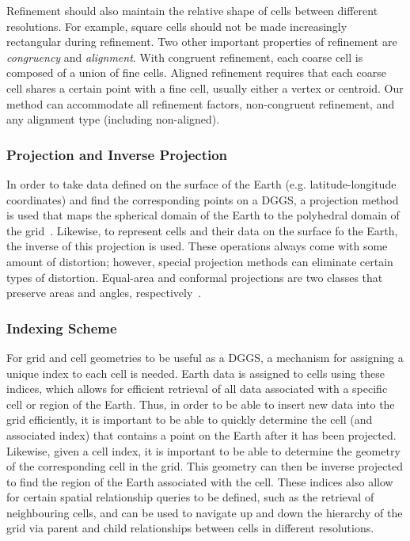 Refinement should also maintain the relative shape of cells between different resolutions.
For example, square cells should not be made increasingly rectangular during refinement.
Two other important properties of refinement are \textit{congruency} and \textit{alignment}.
With congruent refinement, each coarse cell is composed of a union of fine cells.
Aligned refinement requires that each coarse cell shares a certain point with a fine cell, usually either a vertex or centroid.
Our method can accommodate all refinement factors, non-congruent refinement, and any alignment type (including non-aligned).


\subsubsection{Projection and Inverse Projection} \label{sec:dggs:projection}
In order to take data defined on the surface of the Earth (e.g.
latitude-longitude coordinates) and find the corresponding points on a DGGS, a projection method is used that maps the spherical domain of the Earth to the polyhedral domain of the grid~\cite{snyder1987map, snyder1992equal}.
Likewise, to represent cells and their data on the surface fo the Earth, the inverse of this projection is used.
These operations always come with some amount of distortion; however, special projection methods can eliminate certain types of distortion.
Equal-area and conformal projections are two classes that preserve areas and angles, respectively~\cite{snyder1987map}.


\subsubsection{Indexing Scheme} \label{sec::dggs:indexing}
For grid and cell geometries to be useful as a DGGS, a mechanism for assigning a unique index to each cell is needed.
Earth data is assigned to cells using these indices, which allows for efficient retrieval of all data associated with a specific cell or region of the Earth.
Thus, in order to be able to insert new data into the grid efficiently, it is important to be able to quickly determine the cell (and associated index) that contains a point on the Earth after it has been projected.
Likewise, given a cell index, it is important to be able to determine the geometry of the corresponding cell in the grid.
This geometry can then be inverse projected to find the region of the Earth associated with the cell.
These indices also allow for certain spatial relationship queries to be defined, such as the retrieval of neighbouring cells, and can be used to navigate up and down the hierarchy of the grid via parent and child relationships between cells in different resolutions.


